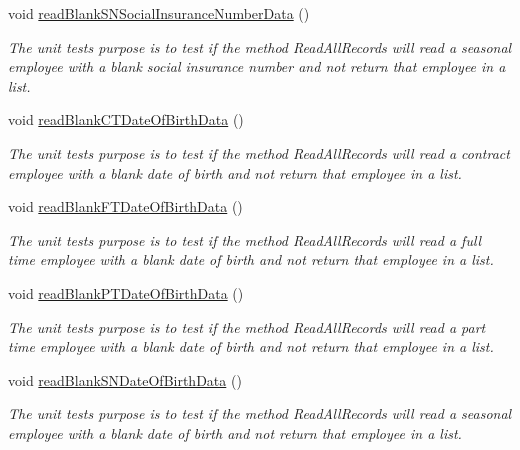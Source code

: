 \begin{DoxyCompactItemize}
void \hyperlink{class_file_i_o_tests_1_1_file_i_o_tests_acffed6026d192e58a743b84d019759c6}{read\+Blank\+S\+N\+Social\+Insurance\+Number\+Data} ()
\begin{DoxyCompactList}\small\item\em The unit test\textquotesingle{}s purpose is to test if the method Read\+All\+Records will read a seasonal employee with a blank social insurance number and not return that employee in a list. \end{DoxyCompactList}\item 
void \hyperlink{class_file_i_o_tests_1_1_file_i_o_tests_a15e9a988c3c2d76c266f4e6703f1a3e9}{read\+Blank\+C\+T\+Date\+Of\+Birth\+Data} ()
\begin{DoxyCompactList}\small\item\em The unit test\textquotesingle{}s purpose is to test if the method Read\+All\+Records will read a contract employee with a blank date of birth and not return that employee in a list. \end{DoxyCompactList}\item 
void \hyperlink{class_file_i_o_tests_1_1_file_i_o_tests_a9ae8eaeafcd739d8d91b20ada054b788}{read\+Blank\+F\+T\+Date\+Of\+Birth\+Data} ()
\begin{DoxyCompactList}\small\item\em The unit test\textquotesingle{}s purpose is to test if the method Read\+All\+Records will read a full time employee with a blank date of birth and not return that employee in a list. \end{DoxyCompactList}\item 
void \hyperlink{class_file_i_o_tests_1_1_file_i_o_tests_ad38321c2af440d038f198a952d8a7a5f}{read\+Blank\+P\+T\+Date\+Of\+Birth\+Data} ()
\begin{DoxyCompactList}\small\item\em The unit test\textquotesingle{}s purpose is to test if the method Read\+All\+Records will read a part time employee with a blank date of birth and not return that employee in a list. \end{DoxyCompactList}\item 
void \hyperlink{class_file_i_o_tests_1_1_file_i_o_tests_a91052ef2ab58e1f31c80e916e7aa5a78}{read\+Blank\+S\+N\+Date\+Of\+Birth\+Data} ()
\begin{DoxyCompactList}\small\item\em The unit test\textquotesingle{}s purpose is to test if the method Read\+All\+Records will read a seasonal employee with a blank date of birth and not return that employee in a list. \end{DoxyCompactList}\item 

\end{DoxyCompactItemize}
